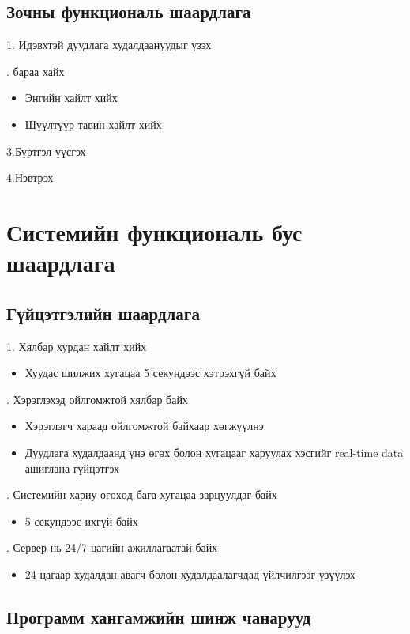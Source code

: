     \subsection{Зочны функциональ шаардлага}
    1. Идэвхтэй дуудлага худалдаануудыг үзэх
    \par{}. бараа хайх
     \begin{itemize}
    \item Энгийн хайлт хийх
    \item Шүүлтүүр тавин хайлт хийх
\end{itemize}
\par\noindent 3.Бүртгэл үүсгэх
\par\noindent 4.Нэвтрэх

\newpage
 \section{Системийн функциональ бус шаардлага}
    \subsection{Гүйцэтгэлийн шаардлага}
    1. Хялбар хурдан хайлт хийх
    \begin{itemize}
    \item Хуудас шилжих хугацаа 5 секундээс хэтрэхгүй байх
\end{itemize}
    \par{}. Хэрэглэхэд ойлгомжтой хялбар байх
    \begin{itemize}
    \item Хэрэглэгч хараад ойлгомжтой байхаар хөгжүүлнэ
    \item Дуудлага худалдаанд үнэ өгөх болон хугацааг харуулах хэсгийг real-time data ашиглана гүйцэтгэх
\end{itemize}
    \par{}. Системийн хариу өгөхөд бага хугацаа зарцуулдаг байх
    \begin{itemize}
    \item 5 секундээс ихгүй байх
\end{itemize}
    \par{}. Сервер нь 24/7 цагийн ажиллагаатай байх
    \begin{itemize}
    \item 24 цагаар худалдан авагч болон худалдаалагчдад үйлчилгээг үзүүлэх
\end{itemize}
    \subsection{ Программ хангамжийн шинж чанарууд}
  
